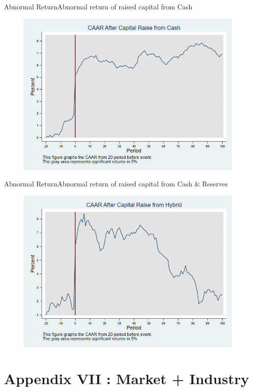 \documentclass{beamer}
\begin{document}
\begin{frame}{Abnormal Return}{Abnormal return of raised capital from Cash}
\label{car_marketCash}
\begin{figure}
\centering
\includegraphics[width=0.65\linewidth]{Output/car_marketCash}
\label{fig:car_marketCash}
\end{figure}
\end{frame}


\begin{frame}{Abnormal Return}{Abnormal return of raised capital from Cash \& Reserves}
\label{car_marketHybrid}
\begin{figure}
\centering
\includegraphics[width=0.65\linewidth]{Output/car_marketHybrid}
\label{fig:car_marketHybrid}
\end{figure}
\end{frame}

\section{Appendix VII : Market + Industry}
\end{document}
